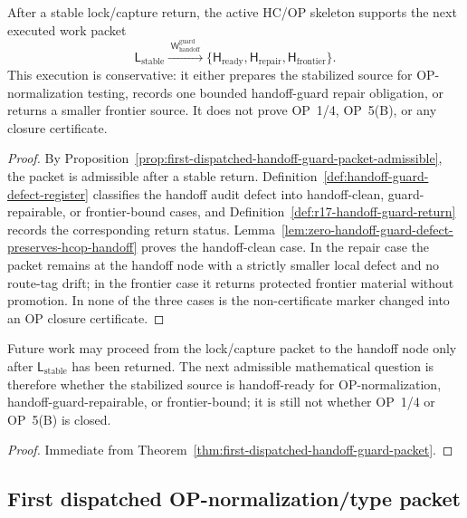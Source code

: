 \begin{theorem}
\label{thm:first-dispatched-handoff-guard-packet}
After a stable lock/capture return, the active HC/OP skeleton supports the next executed work packet
\[
 \mathsf L_{\mathrm{stable}}
 \xrightarrow{\;\mathsf W_{\mathrm{handoff}}^{\mathrm{guard}}\;}
 \{\mathsf H_{\mathrm{ready}},\mathsf H_{\mathrm{repair}},\mathsf H_{\mathrm{frontier}}\}.
\]
This execution is conservative: it either prepares the stabilized source for OP-normalization testing, records one bounded handoff-guard repair obligation, or returns a smaller frontier source. It does not prove OP~1/4, OP~5(B), or any closure certificate.
\end{theorem}

\begin{proof}
By Proposition~\ref{prop:first-dispatched-handoff-guard-packet-admissible}, the packet is admissible after a stable return. Definition~\ref{def:handoff-guard-defect-register} classifies the handoff audit defect into handoff-clean, guard-repairable, or frontier-bound cases, and Definition~\ref{def:r17-handoff-guard-return} records the corresponding return status. Lemma~\ref{lem:zero-handoff-guard-defect-preserves-hcop-handoff} proves the handoff-clean case. In the repair case the packet remains at the handoff node with a strictly smaller local defect and no route-tag drift; in the frontier case it returns protected frontier material without promotion. In none of the three cases is the non-certificate marker changed into an OP closure certificate.
\end{proof}

\begin{corollary}
\label{cor:v3340-r17-working-rule}
Future work may proceed from the lock/capture packet to the handoff node only after \(\mathsf L_{\mathrm{stable}}\) has been returned. The next admissible mathematical question is therefore whether the stabilized source is handoff-ready for OP-normalization, handoff-guard-repairable, or frontier-bound; it is still not whether OP~1/4 or OP~5(B) is closed.
\end{corollary}

\begin{proof}
Immediate from Theorem~\ref{thm:first-dispatched-handoff-guard-packet}.
\end{proof}


\subsection{First dispatched OP-normalization/type packet}
\label{subsec:first-dispatched-op-normalization-type-packet}

